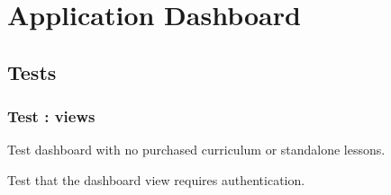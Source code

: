 \documentclass[letterpaper,10pt,english]{sphinxmanual}
\begin{document}
\sphinxstepscope


\chapter{Application Dashboard}
\label{\detokenize{dashboard:application-dashboard}}\label{\detokenize{dashboard::doc}}

\section{Tests}
\label{\detokenize{dashboard:tests}}
\sphinxstepscope


\subsection{Test : views}
\label{\detokenize{dashboard.tests:module-dashboard.tests.test_views}}\label{\detokenize{dashboard.tests:test-views}}\label{\detokenize{dashboard.tests::doc}}

\begin{fulllineitems}
\label{\detokenize{dashboard.tests:dashboard.tests.test_views.test_dashboard_empty_data}}
\pysigstartsignatures
\pysiglinewithargsret
{}
{}
{}
\pysigstopsignatures
\sphinxAtStartPar
Test dashboard with no purchased curriculum or standalone lessons.

\end{fulllineitems}


\begin{fulllineitems}
\label{\detokenize{dashboard.tests:dashboard.tests.test_views.test_dashboard_requires_login}}
\pysigstartsignatures
\pysiglinewithargsret
{}
{}
{}
\pysigstopsignatures
\sphinxAtStartPar
Test that the dashboard view requires authentication.

\end{fulllineitems}
\end{document}
